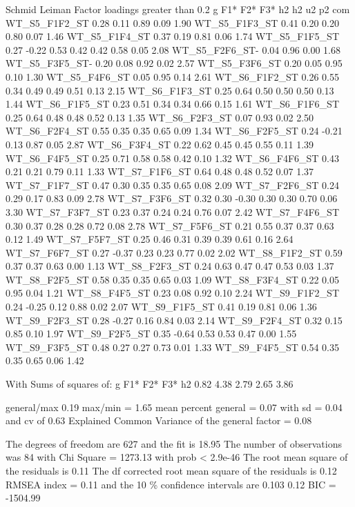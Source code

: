 \documentclass[
]{article}
\begin{document}
Schmid Leiman Factor loadings greater than 0.2 g F1* F2* F3* h2 h2 u2 p2
com WT\_S5\_F1F2\_ST 0.28 0.11 0.89 0.09 1.90 WT\_S5\_F1F3\_ST 0.41 0.20
0.20 0.80 0.07 1.46 WT\_S5\_F1F4\_ST 0.37 0.19 0.81 0.06 1.74
WT\_S5\_F1F5\_ST 0.27 -0.22 0.53 0.42 0.42 0.58 0.05 2.08
WT\_S5\_F2F6\_ST- 0.04 0.96 0.00 1.68 WT\_S5\_F3F5\_ST- 0.20 0.08 0.92
0.02 2.57 WT\_S5\_F3F6\_ST 0.20 0.05 0.95 0.10 1.30 WT\_S5\_F4F6\_ST
0.05 0.95 0.14 2.61 WT\_S6\_F1F2\_ST 0.26 0.55 0.34 0.49 0.49 0.51 0.13
2.15 WT\_S6\_F1F3\_ST 0.25 0.64 0.50 0.50 0.50 0.13 1.44
WT\_S6\_F1F5\_ST 0.23 0.51 0.34 0.34 0.66 0.15 1.61 WT\_S6\_F1F6\_ST
0.25 0.64 0.48 0.48 0.52 0.13 1.35 WT\_S6\_F2F3\_ST 0.07 0.93 0.02 2.50
WT\_S6\_F2F4\_ST 0.55 0.35 0.35 0.65 0.09 1.34 WT\_S6\_F2F5\_ST 0.24
-0.21 0.13 0.87 0.05 2.87 WT\_S6\_F3F4\_ST 0.22 0.62 0.45 0.45 0.55 0.11
1.39 WT\_S6\_F4F5\_ST 0.25 0.71 0.58 0.58 0.42 0.10 1.32
WT\_S6\_F4F6\_ST 0.43 0.21 0.21 0.79 0.11 1.33 WT\_S7\_F1F6\_ST 0.64
0.48 0.48 0.52 0.07 1.37 WT\_S7\_F1F7\_ST 0.47 0.30 0.35 0.35 0.65 0.08
2.09 WT\_S7\_F2F6\_ST 0.24 0.29 0.17 0.83 0.09 2.78 WT\_S7\_F3F6\_ST
0.32 0.30 -0.30 0.30 0.30 0.70 0.06 3.30 WT\_S7\_F3F7\_ST 0.23 0.37 0.24
0.24 0.76 0.07 2.42 WT\_S7\_F4F6\_ST 0.30 0.37 0.28 0.28 0.72 0.08 2.78
WT\_S7\_F5F6\_ST 0.21 0.55 0.37 0.37 0.63 0.12 1.49 WT\_S7\_F5F7\_ST
0.25 0.46 0.31 0.39 0.39 0.61 0.16 2.64 WT\_S7\_F6F7\_ST 0.27 -0.37 0.23
0.23 0.77 0.02 2.02 WT\_S8\_F1F2\_ST 0.59 0.37 0.37 0.63 0.00 1.13
WT\_S8\_F2F3\_ST 0.24 0.63 0.47 0.47 0.53 0.03 1.37 WT\_S8\_F2F5\_ST
0.58 0.35 0.35 0.65 0.03 1.09 WT\_S8\_F3F4\_ST 0.22 0.05 0.95 0.04 1.21
WT\_S8\_F4F5\_ST 0.23 0.08 0.92 0.10 2.24 WT\_S9\_F1F2\_ST 0.24 -0.25
0.12 0.88 0.02 2.07 WT\_S9\_F1F5\_ST 0.41 0.19 0.81 0.06 1.36
WT\_S9\_F2F3\_ST 0.28 -0.27 0.16 0.84 0.03 2.14 WT\_S9\_F2F4\_ST 0.32
0.15 0.85 0.10 1.97 WT\_S9\_F2F5\_ST 0.35 -0.64 0.53 0.53 0.47 0.00 1.55
WT\_S9\_F3F5\_ST 0.48 0.27 0.27 0.73 0.01 1.33 WT\_S9\_F4F5\_ST 0.54
0.35 0.35 0.65 0.06 1.42

With Sums of squares of: g F1* F2* F3* h2 0.82 4.38 2.79 2.65 3.86

general/max 0.19 max/min = 1.65 mean percent general = 0.07 with sd =
0.04 and cv of 0.63 Explained Common Variance of the general factor =
0.08

The degrees of freedom are 627 and the fit is 18.95 The number of
observations was 84 with Chi Square = 1273.13 with prob \textless{}
2.9e-46 The root mean square of the residuals is 0.11 The df corrected
root mean square of the residuals is 0.12 RMSEA index = 0.11 and the 10
\% confidence intervals are 0.103 0.12 BIC = -1504.99
\end{document}
